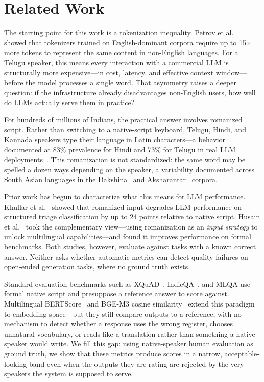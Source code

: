 \section{Related Work}

The starting point for this work is a tokenization inequality. Petrov et al.~\cite{petrov2023tokenization} showed that tokenizers trained on English-dominant corpora require up to 15$\times$ more tokens to represent the same content in non-English languages. For a Telugu speaker, this means every interaction with a commercial LLM is structurally more expensive---in cost, latency, and effective context window---before the model processes a single word. That asymmetry raises a deeper question: if the infrastructure already disadvantages non-English users, how well do LLMs actually serve them in practice?

For hundreds of millions of Indians, the practical answer involves romanized script. Rather than switching to a native-script keyboard, Telugu, Hindi, and Kannada speakers type their language in Latin characters---a behavior documented at 83\% prevalence for Hindi and 73\% for Telugu in real LLM deployments~\cite{khullar2025scriptgap}. This romanization is not standardized: the same word may be spelled a dozen ways depending on the speaker, a variability documented across South Asian languages in the Dakshina~\cite{roark2020dakshina} and Aksharantar~\cite{madhani2023aksharantar} corpora.

Prior work has begun to characterize what this means for LLM performance. Khullar et al.~\cite{khullar2025scriptgap} showed that romanized input degrades LLM performance on structured triage classification by up to 24 points relative to native script. Husain et al.~\cite{husain2024romansetu} took the complementary view---using romanization as an \emph{input strategy} to unlock multilingual capabilities---and found it improves performance on formal benchmarks. Both studies, however, evaluate against tasks with a known correct answer. Neither asks whether automatic metrics can detect quality failures on open-ended generation tasks, where no ground truth exists.

Standard evaluation benchmarks such as XQuAD~\cite{artetxe2020xquad}, IndicQA~\cite{doddapaneni2023indicqa}, and MLQA use formal native script and presuppose a reference answer to score against. Multilingual BERTScore~\cite{zhang2020bertscore} and BGE-M3 cosine similarity~\cite{chen2024bgem3} extend this paradigm to embedding space---but they still compare outputs to a reference, with no mechanism to detect whether a response uses the wrong register, chooses unnatural vocabulary, or reads like a translation rather than something a native speaker would write. We fill this gap: using native-speaker human evaluation as ground truth, we show that these metrics produce scores in a narrow, acceptable-looking band even when the outputs they are rating are rejected by the very speakers the system is supposed to serve.
